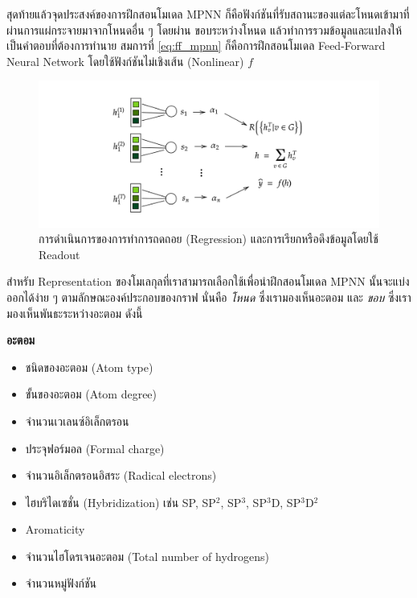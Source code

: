 สุดท้ายแล้วจุดประสงค์ของการฝึกสอนโมเดล MPNN ก็คือฟังก์ชันที่รับสถานะของแต่ละโหนดเข้ามาที่ผ่านการแผ่กระจายมาจากโหนดอื่น ๆ โดยผ่าน%
ขอบระหว่างโหนด แล้วทำการรวมข้อมูลและแปลงให้เป็นคำตอบที่ต้องการทำนาย สมการที่ \ref{eq:ff_mpnn} ก็คือการฝึกสอนโมเดล 
Feed-Forward Neural Network โดยใช้ฟังก์ชันไม่เชิงเส้น (Nonlinear) $f$

\begin{figure}[H]
    \centering
    \includegraphics[width=1.2\linewidth]{fig/mp-operation.png}
    \caption{การดำเนินการของการทำการถดถอย (Regression) และการเรียกหรือดึงข้อมูลโดยใช้ Readout}
    \label{fig:mp_operation}
\end{figure}

สำหรับ Representation ของโมเลกุลที่เราสามารถเลือกใช้เพื่อนำฝึกสอนโมเดล MPNN นั้นจะแบ่งออกได้ง่าย ๆ ตามลักษณะองค์ประกอบของกราฟ 
นั่นคือ \textit{โหนด} ซึ่งเรามองเห็นอะตอม และ \textit{ขอบ} ซึ่งเรามองเห็นพันธะระหว่างอะตอม ดังนี้

\noindent \textbf{อะตอม}
\begin{itemize}
    \item ชนิดของอะตอม (Atom type)
    
    \item ขั้นของอะตอม (Atom degree)
    
    \item จำนวนเวเลนซ์อิเล็กตรอน 
    
    \item ประจุฟอร์มอล (Formal charge)
    
    \item จำนวนอิเล็กตรอนอิสระ (Radical electrons)
    
    \item ไฮบริไดเซชั่น (Hybridization) เช่น SP, SP$^2$, SP$^3$, SP$^3$D, SP$^3$D$^2$
    
    \item Aromaticity
    
    \item จำนวนไฮโดรเจนอะตอม (Total number of hydrogens)
    
    \item จำนวนหมู่ฟังก์ชัน
\end{itemize}
\medskip

